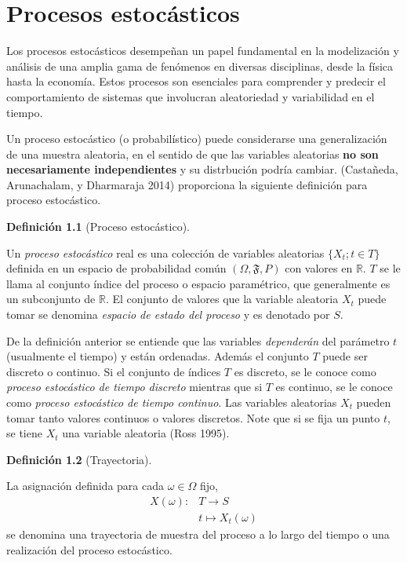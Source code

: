 \documentclass[
  us-letterpaper,
]{scrreprt}
\theoremstyle{plain}
\theoremstyle{definition}
\theoremstyle{plain}
\theoremstyle{definition}
\newtheorem{definition}{Definición}[chapter]
\theoremstyle{remark}
\begin{document}
\chapter{Procesos estocásticos}\label{procesos-estocuxe1sticos}

Los procesos estocásticos desempeñan un papel fundamental en la
modelización y análisis de una amplia gama de fenómenos en diversas
disciplinas, desde la física hasta la economía. Estos procesos son
esenciales para comprender y predecir el comportamiento de sistemas que
involucran aleatoriedad y variabilidad en el tiempo.

Un proceso estocástico (o probabilístico) puede considerarse una
generalización de una muestra aleatoria, en el sentido de que las
variables aleatorias \textbf{no son necesariamente independientes} y su
distrbución podría cambiar. (Castañeda, Arunachalam, y Dharmaraja 2014)
proporciona la siguiente definición para proceso estocástico.

\begin{definition}[Proceso
estocástico]\protect\hypertarget{def-PE}{}\label{def-PE}

Un \emph{proceso estocástico} real es una colección de variables
aleatorias \(\{X_t; t\in T\}\) definida en un espacio de probabilidad
común \((\Omega, \mathfrak{F}, P)\) con valores en \(\mathbb{R}\). \(T\)
se le llama al conjunto índice del proceso o espacio paramétrico, que
generalmente es un subconjunto de \(\mathbb R\). El conjunto de valores
que la variable aleatoria \(X_t\) puede tomar se denomina \emph{espacio
de estado del proceso} y es denotado por \(S\).

\end{definition}

De la definición anterior se entiende que las variables
\emph{dependerán} del parámetro \(t\) (usualmente el tiempo) y están
ordenadas. Además el conjunto \(T\) puede ser discreto o continuo. Si el
conjunto de índices \(T\) es discreto, se le conoce como \emph{proceso
estocástico de tiempo discreto} mientras que si \(T\) es continuo, se le
conoce como \emph{proceso estocástico de tiempo continuo}. Las variables
aleatorias \(X_t\) pueden tomar tanto valores continuos o valores
discretos. Note que si se fija un punto \(t\), se tiene \(X_t\) una
variable aleatoria (Ross 1995).

\begin{definition}[Trayectoria]\protect\hypertarget{def-realiza}{}\label{def-realiza}

La asignación definida para cada \(\omega\in\Omega\) fijo,
\[\begin{split}X(\omega): & T\to S\\ &t\mapsto X_t(\omega)\end{split}\]
se denomina una trayectoria de muestra del proceso a lo largo del tiempo
o una realización del proceso estocástico.

\end{definition}
\end{document}
